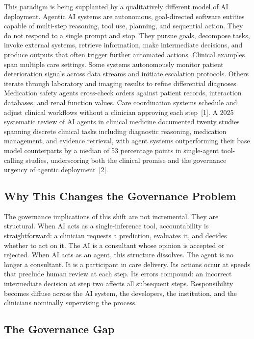 This paradigm is being supplanted by a qualitatively different model of
AI deployment. Agentic AI systems are autonomous, goal-directed software
entities capable of multi-step reasoning, tool use, planning, and
sequential action. They do not respond to a single prompt and stop. They
pursue goals, decompose tasks, invoke external systems, retrieve
information, make intermediate decisions, and produce outputs that often
trigger further automated actions. Clinical examples span multiple care
settings. Some systems autonomously monitor patient deterioration
signals across data streams and initiate escalation protocols. Others
iterate through laboratory and imaging results to refine differential
diagnoses. Medication safety agents cross-check orders against patient
records, interaction databases, and renal function values. Care
coordination systems schedule and adjust clinical workflows without a
clinician approving each step~{[}1{]}. A 2025 systematic review of AI
agents in clinical medicine documented twenty studies spanning discrete
clinical tasks including diagnostic reasoning, medication management,
and evidence retrieval, with agent systems outperforming their base
model counterparts by a median of 53 percentage points in single-agent
tool-calling studies, underscoring both the clinical promise and the
governance urgency of agentic deployment~{[}2{]}.

\subsection{Why This Changes the Governance
Problem}\label{why-this-changes-the-governance-problem}

The governance implications of this shift are not incremental. They are
structural. When AI acts as a single-inference tool, accountability is
straightforward: a clinician requests a prediction, evaluates it, and
decides whether to act on it. The AI is a consultant whose opinion is
accepted or rejected. When AI acts as an agent, this structure
dissolves. The agent is no longer a consultant. It is a participant in
care delivery. Its actions occur at speeds that preclude human review at
each step. Its errors compound: an incorrect intermediate decision at
step two affects all subsequent steps. Responsibility becomes diffuse
across the AI system, the developers, the institution, and the
clinicians nominally supervising the process.

\subsection{The Governance Gap}\label{the-governance-gap}

